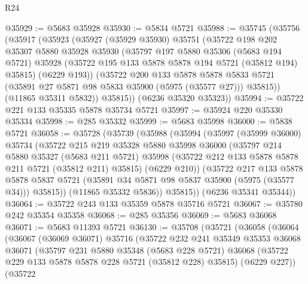 \begin{lexlean}{R24}
\begin{coremodule}
@35929 := @5683 @35928
@35930 := @5834 @5721
@35988 := @35745
    (@35756
      (@35917
        (@35923
          (@35927
            (@35929 @35930)
            @35751
            (@35722
              @198
              @202
              @35307
              @5880
              @35928
              @35930
              (@35797
                @197
                @5880
                @35306
                (@5683 @194 @5721)
                @35928
                (@35722 @195 @133 @5878 @5878 @194 @5721 (@35812 @194) @35815)
                (@6229 @193))
              (@35722
                @200
                @133
                @5878
                @5878
                @5833
                @5721
                (@35891 @27 @5871 @98 @5833 @35900 (@5975 (@35577 @27)))
                @35815))
            (@11865 @35311 @5832))
          @35815))
      (@6236 @35320 @35323))
@35994 := @35722 @221 @133 @35335 @5878 @35734 @5721
@35997 := @35924 @220 @35330 @35334
@35998 := @285 @35332
@35999 := @5683 @35998
@36000 := @5838 @5721
@36058 := @35728
    (@35739
      (@35988
        (@35994
          (@35997
            (@35999 @36000)
            @35734
            (@35722
              @215
              @219
              @35328
              @5880
              @35998
              @36000
              (@35797
                @214
                @5880
                @35327
                (@5683 @211 @5721)
                @35998
                (@35722 @212 @133 @5878 @5878 @211 @5721 (@35812 @211) @35815)
                (@6229 @210))
              (@35722
                @217
                @133
                @5878
                @5878
                @5837
                @5721
                (@35891 @34 @5871 @98 @5837 @35900 (@5975 (@35577 @34)))
                @35815))
            (@11865 @35332 @5836))
          @35815))
      (@6236 @35341 @35344))
@36064 := @35722 @243 @133 @35359 @5878 @35716 @5721
@36067 := @35780 @242 @35354 @35358
@36068 := @285 @35356
@36069 := @5683 @36068
@36071 := @5683 @11393 @5721
@36130 := @35708
    (@35721
      (@36058
        (@36064
          (@36067
            (@36069 @36071)
            @35716
            (@35722
              @232
              @241
              @35349
              @35353
              @36068
              @36071
              (@35797
                @231
                @5880
                @35348
                (@5683 @228 @5721)
                @36068
                (@35722 @229 @133 @5878 @5878 @228 @5721 (@35812 @228) @35815)
                (@6229 @227))
              (@35722

\end{coremodule}
\end{lexlean}
